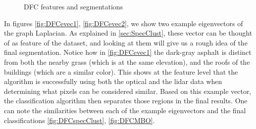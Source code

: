 \documentclass[journal]{IEEEtran}
\begin{document}
\begin{figure}[!t]
{    \label{fig:DFCMBO}} %
  \hfil%
  \hfil %
  \caption{DFC features and segmentations}
  \label{fig:DFCfig2}
\end{figure}


In figures \ref{fig:DFCevec1}, \ref{fig:DFCevec2}, we show two example
eigenvectors of the graph Laplacian. As explained in \ref{sec:SpecClust}, these
vector can be thought of as feature of the dataset, and looking at them will
give us a rough idea of the final segmentation. Notice how in \ref{fig:DFCevec1}
the dark-gray asphalt is distinct from both the nearby grass (which is at the
same elevation), and the roofs of the buildings (which are a similar
color). This shows at the feature level that the algorithm is successfully using
both the optical and the lidar data when determining what pixels can be
considered similar. Based on this example vector, the classification algorithm
then separates those regions in the final results. One can note the similarities
between each of the example eigenvectors and the final classifications
\ref{fig:DFCspecClust}, \ref{fig:DFCMBO}.
\end{document}

